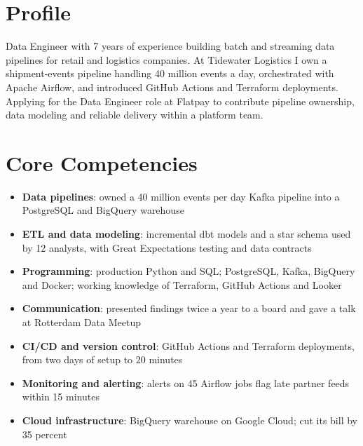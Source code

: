 \documentclass[11pt,a4paper,sans]{moderncv}
\begin{document}
\makecvtitle

\section{Profile}
Data Engineer with 7 years of experience building batch and streaming data pipelines for retail and logistics
companies. At Tidewater Logistics I own a shipment-events pipeline handling 40 million events a day, orchestrated with
Apache Airflow, and introduced GitHub Actions and Terraform deployments. Applying for the Data Engineer role at
Flatpay to contribute pipeline ownership, data modeling and reliable delivery within a platform team.

\section{Core Competencies}
\begin{itemize}
  \item \textbf{Data pipelines}: owned a 40 million events per day Kafka pipeline into a PostgreSQL and BigQuery warehouse
  \item \textbf{ETL and data modeling}: incremental dbt models and a star schema used by 12 analysts, with Great Expectations testing and data contracts
  \item \textbf{Programming}: production Python and SQL; PostgreSQL, Kafka, BigQuery and Docker; working knowledge of Terraform, GitHub Actions and Looker
  \item \textbf{Communication}: presented findings twice a year to a board and gave a talk at Rotterdam Data Meetup
  \item \textbf{CI/CD and version control}: GitHub Actions and Terraform deployments, from two days of setup to 20 minutes
  \item \textbf{Monitoring and alerting}: alerts on 45 Airflow jobs flag late partner feeds within 15 minutes
  \item \textbf{Cloud infrastructure}: BigQuery warehouse on Google Cloud; cut its bill by 35 percent
\end{itemize}
\end{document}
